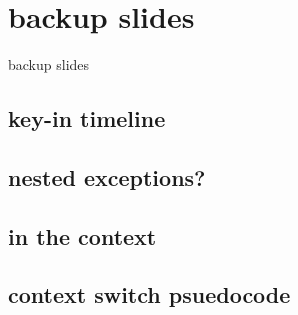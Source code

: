 \date{}
\title{}
\date{}

\begin{frame}
    \titlepage
\end{frame}





\section{backup slides}
\begin{frame}{backup slides}
\end{frame}

\subsection{key-in timeline}


\subsection{nested exceptions?}


\subsection{in the context}


\subsection{context switch psuedocode}


